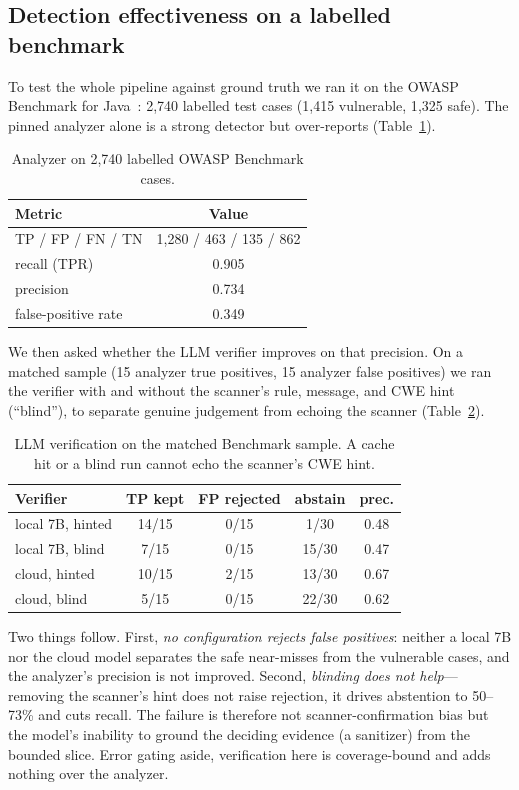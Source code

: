 \documentclass[conference]{IEEEtran}
\begin{document}
\subsection{Detection effectiveness on a labelled benchmark}
To test the whole pipeline against ground truth we ran it on the OWASP
Benchmark for Java~\cite{owaspbench}: 2{,}740 labelled test cases (1{,}415
vulnerable, 1{,}325 safe). The pinned analyzer alone is a strong detector but
over-reports (Table~\ref{tab:benchmark}).

\begin{table}[t]
\centering
\caption{Analyzer on 2{,}740 labelled OWASP Benchmark cases.}
\label{tab:benchmark}
\small
\begin{tabular}{@{}lc@{}}
\toprule
Metric & Value \\
\midrule
TP / FP / FN / TN & 1{,}280 / 463 / 135 / 862 \\
recall (TPR) & 0.905 \\
precision & 0.734 \\
false-positive rate & 0.349 \\
\bottomrule
\end{tabular}
\end{table}

We then asked whether the LLM verifier improves on that precision. On a matched
sample (15 analyzer true positives, 15 analyzer false positives) we ran the
verifier with and without the scanner's rule, message, and CWE hint
(``blind''), to separate genuine judgement from echoing the scanner
(Table~\ref{tab:verifier}).

\begin{table}[t]
\centering
\caption{LLM verification on the matched Benchmark sample. A cache hit or a
blind run cannot echo the scanner's CWE hint.}
\label{tab:verifier}
\small
\begin{tabular}{@{}lcccc@{}}
\toprule
Verifier & TP kept & FP rejected & abstain & prec. \\
\midrule
local 7B, hinted & 14/15 & 0/15 & 1/30 & 0.48 \\
local 7B, blind  & 7/15 & 0/15 & 15/30 & 0.47 \\
cloud, hinted    & 10/15 & 2/15 & 13/30 & 0.67 \\
cloud, blind     & 5/15 & 0/15 & 22/30 & 0.62 \\
\bottomrule
\end{tabular}
\end{table}

Two things follow. First, \emph{no configuration rejects false positives}: neither
a local 7B nor the cloud model separates the safe near-misses from the vulnerable
cases, and the analyzer's precision is not improved. Second, \emph{blinding does
not help}---removing the scanner's hint does not raise rejection, it drives
abstention to 50--73\% and cuts recall. The failure is therefore not
scanner-confirmation bias but the model's inability to ground the deciding
evidence (a sanitizer) from the bounded slice. Error gating aside, verification
here is coverage-bound and adds nothing over the analyzer.
\end{document}
